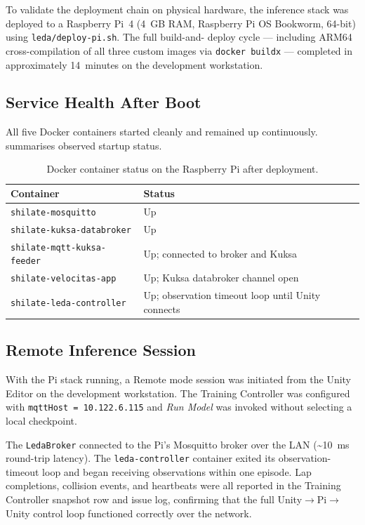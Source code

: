 To validate the deployment chain on physical hardware, the inference
stack was deployed to a Raspberry Pi~4 (4~GB RAM, Raspberry Pi OS
Bookworm, 64-bit) using \texttt{leda/deploy-pi.sh}. The full build-and-
deploy cycle --- including ARM64 cross-compilation of all three custom
images via \texttt{docker buildx} --- completed in approximately
14~minutes on the development workstation.

\subsection{Service Health After Boot}
\label{sec:pi-health}

All five Docker containers started cleanly and remained up continuously.
 summarises observed startup status.

\begin{table}[H]
\caption{Docker container status on the Raspberry Pi after deployment.}
\label{table:pi-health}
\begin{tabular}{|p{5.5cm}|p{5cm}|}
  \hline
  \textbf{Container} & \textbf{Status} \\
  \hline
  \nolinkurl{shilate-mosquitto}         & Up \\
  \hline
  \nolinkurl{shilate-kuksa-databroker}  & Up \\
  \hline
  \nolinkurl{shilate-mqtt-kuksa-feeder} & Up; connected to broker and Kuksa \\
  \hline
  \nolinkurl{shilate-velocitas-app}     & Up; Kuksa databroker channel open \\
  \hline
  \nolinkurl{shilate-leda-controller}   & Up; observation timeout loop until
                                     Unity connects \\
  \hline
\end{tabular}
\end{table}

\subsection{Remote Inference Session}
\label{sec:pi-inference}

With the Pi stack running, a Remote mode session was initiated from the
Unity Editor on the development workstation. The Training Controller was
configured with \texttt{mqttHost = 10.122.6.115} and \textit{Run Model}
was invoked without selecting a local checkpoint.

The \texttt{LedaBroker} connected to the Pi's Mosquitto broker over the
LAN (\textasciitilde10~ms round-trip latency). The
\texttt{leda-controller} container exited its observation-timeout loop
and began receiving observations within one episode. Lap completions,
collision events, and heartbeats were all reported in the Training
Controller snapshot row and issue log, confirming that the full
Unity$\to$Pi$\to$Unity control loop functioned correctly over the
network.

